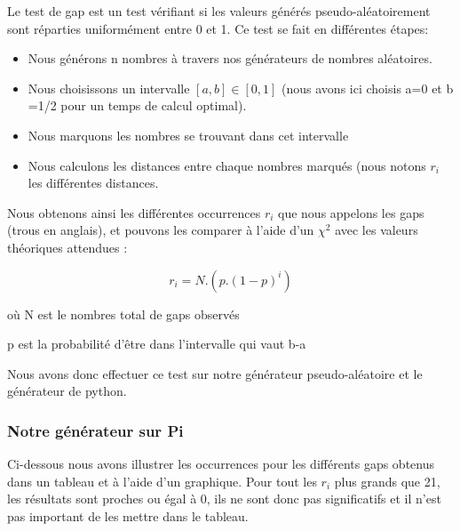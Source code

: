 \documentclass[10pt,a4paper]{article}
\begin{document}
Le test de gap est un test vérifiant si les valeurs générés pseudo-aléatoirement sont réparties uniformément entre 0 et 1. Ce test se fait en différentes étapes:
\begin{itemize}
\item Nous générons n nombres à travers nos générateurs de nombres aléatoires.
\item Nous choisissons un intervalle $[a,b]\in[0,1]$ (nous avons ici choisis a=0 et b =1/2 pour un temps de calcul optimal).
\item Nous marquons les nombres se trouvant dans cet intervalle
\item Nous calculons les distances entre chaque nombres marqués (nous notons $r_i$ les différentes distances. 
\end{itemize} 

Nous obtenons ainsi les différentes occurrences $r_i$ que nous appelons les gaps (trous en anglais), et pouvons les comparer à l'aide d'un $\chi^2$ avec les valeurs théoriques attendues :

\[
	r_i = N. (p.(1-p)^i)
\] 


où N est le nombres total de gaps observés

p est la probabilité d'être dans l'intervalle qui vaut b-a


Nous avons donc effectuer ce test sur notre générateur pseudo-aléatoire et le générateur de python.

	\subsubsection{Notre générateur sur Pi}

Ci-dessous nous avons illustrer les occurrences pour les différents gaps obtenus dans un tableau et à l'aide d'un graphique. 
Pour tout les $r_i $ plus grands que 21, les résultats sont proches ou égal à 0, ils ne sont donc pas significatifs et il n'est pas important de les mettre dans le tableau.
\end{document}
